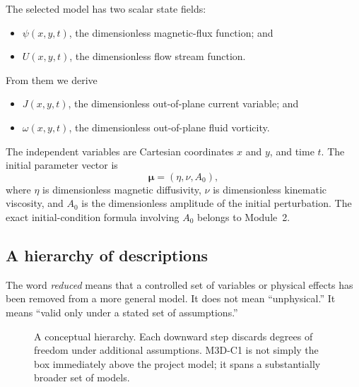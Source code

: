 \documentclass[11pt]{article}
\begin{document}
The selected model has two scalar state fields:
\begin{itemize}
  \item $\psi(x,y,t)$, the dimensionless magnetic-flux function; and
  \item $U(x,y,t)$, the dimensionless flow stream function.
\end{itemize}
From them we derive
\begin{itemize}
  \item $J(x,y,t)$, the dimensionless out-of-plane current variable; and
  \item $\omega(x,y,t)$, the dimensionless out-of-plane fluid vorticity.
\end{itemize}
The independent variables are Cartesian coordinates $x$ and $y$, and time $t$. The initial parameter vector is
\begin{equation}
\boldsymbol{\mu}=(\eta,\nu,A_0),
\end{equation}
where $\eta$ is dimensionless magnetic diffusivity, $\nu$ is dimensionless kinematic viscosity, and $A_0$ is the dimensionless amplitude of the initial perturbation. The exact initial-condition formula involving $A_0$ belongs to Module~2.

\subsection{A hierarchy of descriptions}

The word \emph{reduced} means that a controlled set of variables or physical effects has been removed from a more general model. It does not mean ``unphysical.'' It means ``valid only under a stated set of assumptions.''

\begin{figure}[htbp]
\centering
{}
\caption{A conceptual hierarchy. Each downward step discards degrees of freedom under additional assumptions. M3D-C1 is not simply the box immediately above the project model; it spans a substantially broader set of models.}
\label{fig:hierarchy}
\end{figure}
\end{document}
